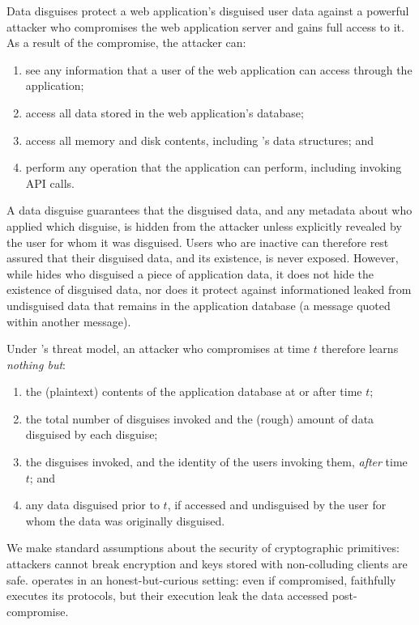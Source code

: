 %
Data disguises protect a web application's disguised user data against a
powerful attacker who compromises the web application server and gains full
access to it.
%
As a result of the compromise, the attacker can:
\begin{enumerate}[nosep]
 \item see any information that a user of the web application can access through
   the application;
  \item access all data stored in the web application's database;
  \item access all memory and disk contents, including \sys's data structures; and
  \item perform any operation that the application can perform, including invoking
    \sys API calls.
\end{enumerate}
%
A data disguise guarantees that the disguised data, and any metadata about who applied
which disguise, is hidden from the attacker unless explicitly revealed by the user
for whom it was disguised.
%
Users who are inactive can therefore rest assured that their disguised data, and
its existence, is never exposed.
%
However, while \sys hides who disguised a piece of application data, it does not hide
the existence of disguised data, nor does it protect against informationed leaked from
undisguised data that remains in the application database (\eg a message quoted
within another message).
%

%
Under \sys's threat model, an attacker who compromises \sys at time $t$ therefore
learns \emph{nothing but}:
%
\begin{enumerate}[nosep]
  \item the (plaintext) contents of the application database at or after time $t$;
  \item the total number of disguises invoked and the (rough) amount of data
    disguised by each disguise;
  \item the disguises invoked, and the identity of the users invoking them,
    \emph{after} time $t$; and
  \item any data disguised prior to $t$, if accessed and undisguised by the user
    for whom the data was originally disguised.
\end{enumerate}
%
We make standard assumptions about the security of cryptographic primitives: attackers
cannot break encryption and keys stored with non-colluding clients are safe.
%
\sys operates in an honest-but-curious setting: even if compromised, \sys faithfully
executes its protocols, but their execution leak the data accessed post-compromise.
%


